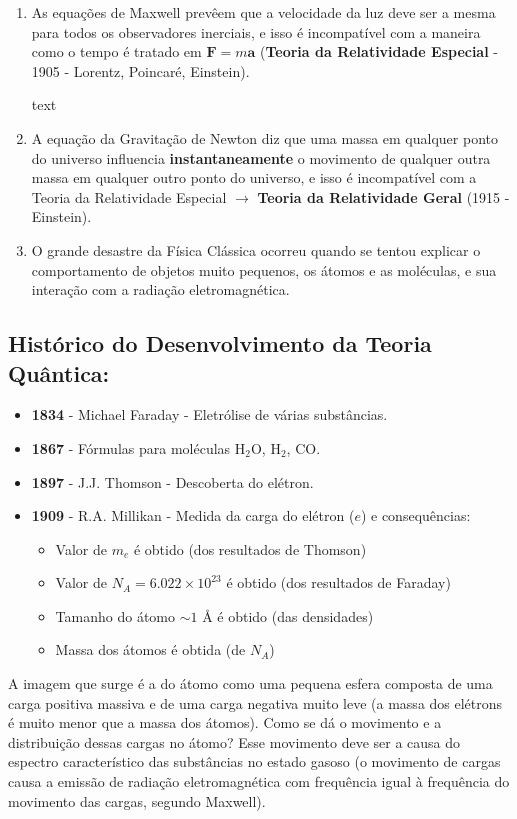 \begin{enumerate}
\item As equações de Maxwell prevêem que a velocidade da luz deve ser a mesma para todos os observadores inerciais, e isso é incompatível com a maneira como o tempo é tratado em ${\bm F} = m{\bm a}$ (\textbf{Teoria da Relatividade Especial} - 1905 - Lorentz, Poincaré, Einstein).

text
\item A equação da Gravitação de Newton diz que uma massa em qualquer ponto do universo influencia \textbf{instantaneamente} o movimento de qualquer outra massa em qualquer outro ponto do universo, e isso é incompatível com a Teoria da Relatividade Especial $\rightarrow$ \textbf{Teoria da Relatividade Geral} (1915 - Einstein).

\item O grande desastre da Física Clássica ocorreu quando se tentou explicar o comportamento de objetos muito pequenos, os átomos e as moléculas, e sua interação com a radiação eletromagnética.
\end{enumerate}

\subsection*{Histórico do Desenvolvimento da Teoria Quântica:}
\begin{itemize}
\item \textbf{1834} - Michael Faraday - Eletrólise de várias substâncias.
\item \textbf{1867} - Fórmulas para moléculas $\text{H}_2\text{O}$, $\text{H}_2$, $\text{CO}$.
\item \textbf{1897} - J.J. Thomson - Descoberta do elétron.
\item \textbf{1909} - R.A. Millikan - Medida da carga do elétron ($e$) e consequências:
\begin{itemize}
\item Valor de $m_e$ é obtido (dos resultados de Thomson)
\item Valor de $N_A = 6.022 \times 10^{23}$ é obtido (dos resultados de Faraday)
\item Tamanho do átomo $\sim 1$ Å é obtido (das densidades)
\item Massa dos átomos é obtida (de $N_A$)
\end{itemize}
\end{itemize}

A imagem que surge é a do átomo como uma pequena esfera composta de uma carga 
positiva massiva e de uma carga negativa muito leve (a massa dos elétrons é 
muito menor que a massa dos átomos). Como se dá o movimento e a distribuição 
dessas cargas no átomo? Esse movimento deve ser a causa do espectro 
característico das substâncias no estado gasoso (o movimento de cargas causa a 
emissão de radiação eletromagnética com frequência igual à frequência do 
movimento das cargas, segundo Maxwell).

